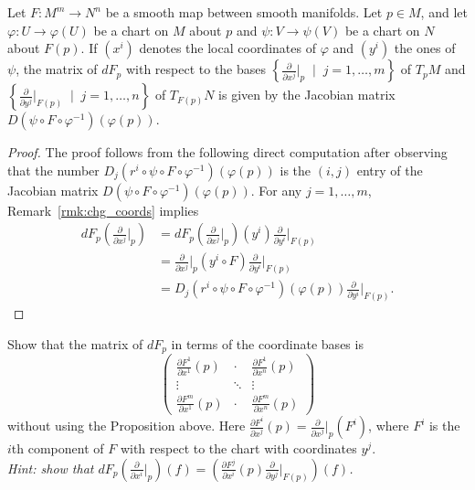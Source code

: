 \begin{proposition}\label{prop:DiffCoords}
	Let $F:M^m\to N^n$ be a smooth map between smooth manifolds.
	Let $p\in M$, and let $\varphi : U \to \varphi(U)$ be a chart on $M$ about $p$ and $\psi: V \to \psi(V)$ be a chart on $N$ about $F(p)$.
	If $(x^i)$ denotes the local coordinates of $\varphi$ and $(y^i)$ the ones of $\psi$, the matrix of $dF_p$ with respect to the bases $\left\{\frac{\partial}{\partial x^j}\big|_p \;\mid\; j=1,\ldots,m\right\}$ of $T_pM$ and $\left\{\frac{\partial}{\partial y^j}\big|_{F(p)} \;\mid\; j=1,\ldots,n\right\}$ of $T_{F(p)}N$ is given by the Jacobian matrix $D(\psi\circ F \circ\varphi^{-1})(\varphi(p))$.
\end{proposition}
\begin{proof}
	The proof follows from the following direct computation after observing that the number $D_j(r^i \circ \psi \circ F \circ \varphi^{-1})(\varphi(p))$ is the $(i,j)$ entry of the Jacobian matrix $D(\psi\circ F \circ\varphi^{-1})(\varphi(p))$. For any $j=1,\ldots,m$, Remark~\ref{rmk:chg_coords} implies
	\begin{align}
		dF_p \left(\frac{\partial}{\partial x^j}\Big|_p\right)
		 & =                                                                                                   %
		dF_p \left(\frac{\partial}{\partial x^j}\Big|_p\right) (y^i) \frac{\partial}{\partial y^i}\Big|_{F(p)} \\
		 & =                                                                                                   %
		\frac{\partial}{\partial x^j}\Big|_p (y^i \circ F) \frac{\partial}{\partial y^i}\Big|_{F(p)}           \\
		 & =                                                                                                   %
		D_j(r^i \circ \psi \circ F \circ \varphi^{-1})(\varphi(p)) \frac{\partial}{\partial y^i}\Big|_{F(p)}.
	\end{align}
\end{proof}

\begin{exercise}
	Show that the matrix of $d F_p$ in terms of the coordinate bases is
	\begin{equation}
		\begin{pmatrix}
			\frac{\partial F^1}{\partial x^1} (p) & \cdot  & \frac{\partial F^1}{\partial x^n} (p) \\
			\vdots                                & \ddots & \vdots                                \\
			\frac{\partial F^m}{\partial x^1} (p) & \cdot  & \frac{\partial F^m}{\partial x^n} (p)
		\end{pmatrix}
	\end{equation}
	without using the Proposition above. Here $\frac{\partial F^i}{\partial x^j} (p) = \frac{\partial}{\partial x^j}\big|_p (F^i)$, where $F^i$ is the $i$th component of $F$ with respect to the chart with coordinates $y^j$.\\
	\textit{\small Hint: show that $d F_p \left(\frac{\partial}{\partial x^i}\big|_p\right) (f) = \left(\frac{\partial F^j}{\partial x^i} (p) \frac{\partial}{\partial y^j}\big|_{F(p)}\right) (f)$.}
\end{exercise}

